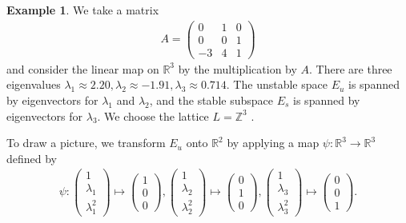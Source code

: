 \documentclass[a4]{amsart}
\theoremstyle{definition}
\newtheorem{ex}[theorem]{Example}
\begin{document}
\begin{ex}
    We take a matrix
    \begin{align*}
        A=\begin{pmatrix}
            0 &1 &0\\
            0 &0 &1 \\
            -3 &4 &1
        \end{pmatrix}
    \end{align*}
    and consider the linear map
    on $\mathbb{R}^3$ by the multiplication
    by $A$. There are three eigenvalues
    $\lambda_1\approx 2.20, \lambda_2\approx -1.91, \lambda_3\approx 0.714$. The unstable
    space $E_u$ is spanned by eigenvectors
    for $\lambda_1$ and $\lambda_2$, and
    the stable subspace $E_s$ is spanned
    by eigenvectors for $\lambda_3$.
    We choose the lattice $L=\mathbb{Z}^3$ .

   To draw a picture, we transform $E_u$ onto $\mathbb{R}^2$ by applying a map $\psi\colon\mathbb{R}^3\rightarrow\mathbb{R}^3$ defined by
    \begin{align*}
        \psi\colon\begin{pmatrix}
            1\\\lambda_1\\\lambda_1^2
        \end{pmatrix}
        \mapsto\begin{pmatrix}
            1\\0\\0
        \end{pmatrix},
        \begin{pmatrix}
            1\\\lambda_2\\\lambda_2^2
        \end{pmatrix}
        \mapsto\begin{pmatrix}
            0\\1\\0
        \end{pmatrix},
        \begin{pmatrix}
            1\\\lambda_3\\\lambda_3^2
        \end{pmatrix}
        \mapsto\begin{pmatrix}
            0\\0\\1
        \end{pmatrix}.
    \end{align*}


\end{ex}
\end{document}
